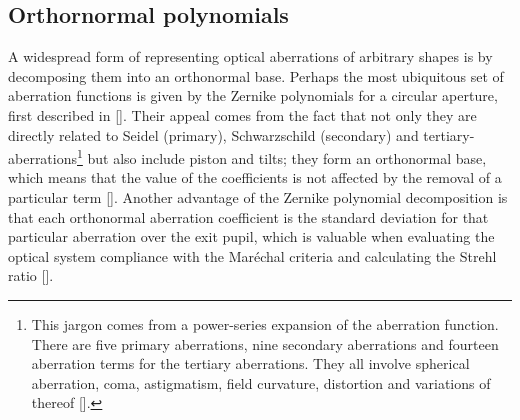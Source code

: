\begin{refsection}
\subsection{Orthornormal polynomials}\label{sec:orthonormal_polynomials}

A widespread form of representing optical aberrations of arbitrary shapes is by decomposing them into an orthonormal base. Perhaps the most ubiquitous set of aberration functions is given by the Zernike polynomials for a circular aperture, first described in [\cite{Zernike1934}]. Their appeal comes from the fact that not only they are directly related to Seidel (primary), Schwarzschild (secondary) and tertiary-aberrations\footnote{This jargon comes from a power-series expansion of the aberration function. There are five primary aberrations, nine secondary aberrations and fourteen aberration terms for the tertiary aberrations. They all involve spherical aberration, coma, astigmatism, field
curvature, distortion and variations of thereof [\cite{Mahajan2013}].} but also include piston and tilts; they form an orthonormal base, which means that the value of the coefficients is not affected by the removal of a particular term [\cite{Mahajan2007}]. Another advantage of the Zernike polynomial decomposition is that each orthonormal aberration coefficient is the standard deviation for that particular aberration over the exit pupil, which is valuable when evaluating the optical system compliance with the  Mar\'echal criteria and calculating the Strehl ratio [\cite{Mahajan1983}].


\end{refsection}
